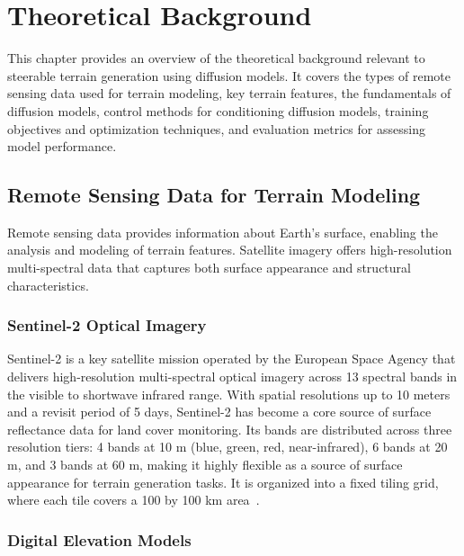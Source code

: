 \chapter{Theoretical Background}
\label{cha:theoretical}

This chapter provides an overview of the theoretical background relevant to steerable terrain generation using diffusion models. It covers the types of remote sensing data used for terrain modeling, key terrain features, the fundamentals of diffusion models, control methods for conditioning diffusion models, training objectives and optimization techniques, and evaluation metrics for assessing model performance.

\section{Remote Sensing Data for Terrain Modeling}
\label{sec:remote_sensing_data}

Remote sensing data provides information about Earth's surface, enabling the analysis and modeling of terrain features. Satellite imagery offers high-resolution multi-spectral data that captures both surface appearance and structural characteristics.

\subsection{Sentinel-2 Optical Imagery}
\label{subsec:sentinel2_optical_imagery}

Sentinel-2 is a key satellite mission operated by the European Space Agency that delivers high-resolution multi-spectral optical imagery across 13 spectral bands in the visible to shortwave infrared range. With spatial resolutions up to 10 meters and a revisit period of 5 days, Sentinel-2 has become a core source of surface reflectance data for land cover monitoring. Its bands are distributed across three resolution tiers: 4 bands at 10 m (blue, green, red, near-infrared),
6 bands at 20 m, and 3 bands at 60 m, making it highly flexible as a source of surface appearance for terrain generation tasks. It is organized into a fixed tiling grid, where each tile covers a 100 by 100 km area~\cite{drusch2012sentinel2, falkner2025sentinel2tiling}.

\subsection{Digital Elevation Models}
\label{subsec:digital_elevation_models}

